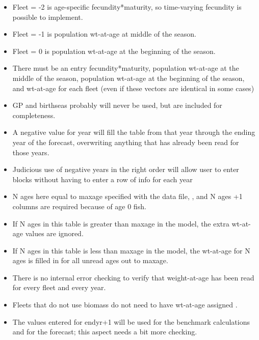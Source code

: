 \begin{itemize}
	\item Fleet = -2 is age-specific fecundity*maturity, so time-varying fecundity is possible to implement.
	\item Fleet = -1 is population wt-at-age at middle of the season.
	\item Fleet = 0 is population wt-at-age at the beginning of the season.
	\item There must be an entry fecundity*maturity, population wt-at-age at the middle of the season, population wt-at-age at the beginning of the season, and wt-at-age for each fleet (even if these vectors are identical in some cases)
	\item GP and birthseas probably will never be used, but are included for completeness.
	\item A negative value for year will fill the table from that year through the ending year of the forecast, overwriting anything that has already been read for those years.
	\item Judicious use of negative years in the right order will allow user to enter blocks without having to enter a row of info for each year
	\item N ages here equal to maxage specified with the data file, , and N ages +1 columns are required because of age 0 fish.
	\item If N ages in this table is greater than maxage in the model, the extra wt-at-age values are ignored.
	\item If N ages in this table is less than maxage in the model, the wt-at-age for N ages is filled in for all unread ages out to maxage.
	\item There is no internal error checking to  verify that weight-at-age has been read for every fleet and every year. 
	\item Fleets that do not use biomass do not need to have wt-at-age assigned	.
	\item The values entered for endyr+1 will be used for the benchmark calculations and for the forecast; this aspect needs a bit more checking.
\end{itemize}

